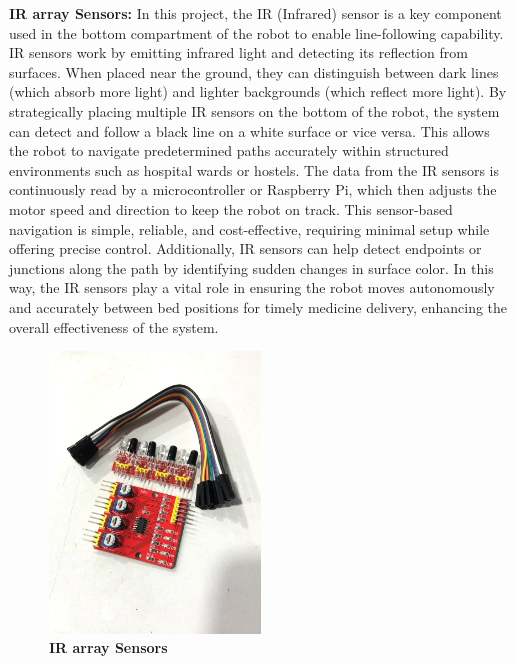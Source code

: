 \textbf{IR array Sensors: }In this project, the IR (Infrared) sensor is a key component used in the bottom compartment of the robot to enable line-following capability. IR sensors work by emitting infrared light and detecting its reflection from surfaces. When placed near the ground, they can distinguish between dark lines (which absorb more light) and lighter backgrounds (which reflect more light). By strategically placing multiple IR sensors on the bottom of the robot, the system can detect and follow a black line on a white surface or vice versa. This allows the robot to navigate predetermined paths accurately within structured environments such as hospital wards or hostels. The data from the IR sensors is continuously read by a microcontroller or Raspberry Pi, which then adjusts the motor speed and direction to keep the robot on track. This sensor-based navigation is simple, reliable, and cost-effective, requiring minimal setup while offering precise control. Additionally, IR sensors can help detect endpoints or junctions along the path by identifying sudden changes in surface color. In this way, the IR sensors play a vital role in ensuring the robot moves autonomously and accurately between bed positions for timely medicine delivery, enhancing the overall effectiveness of the system.

\begin{figure}[htbp!]
\centering
\includegraphics[width=0.5\textwidth]{images/3.4.jpg}
\caption{\textbf{IR array Sensors}}
\label{fig:3.4}
\end{figure}

\vspace{1.5\baselineskip} %

